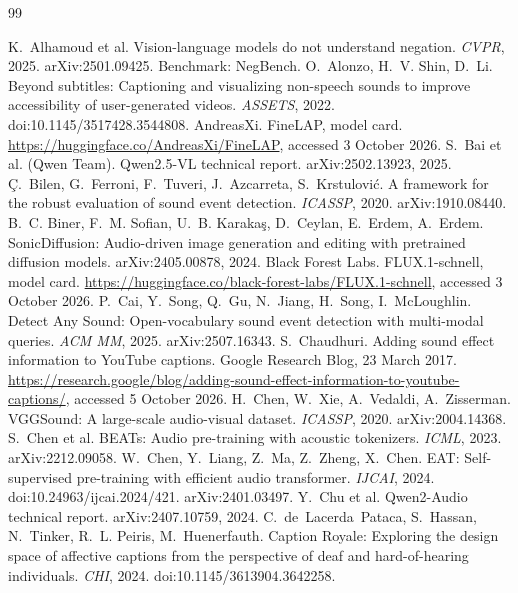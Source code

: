 \begin{thebibliography}{99}\small\setlength{\itemsep}{0.5pt}

 K.~Alhamoud et al. Vision-language models do not understand negation. \emph{CVPR}, 2025. arXiv:2501.09425. Benchmark: NegBench.
 O.~Alonzo, H.~V. Shin, D.~Li. Beyond subtitles: Captioning and visualizing non-speech sounds to improve accessibility of user-generated videos. \emph{ASSETS}, 2022. doi:10.1145/3517428.3544808.
 AndreasXi. FineLAP, model card. \url{https://huggingface.co/AndreasXi/FineLAP}, accessed 3 October 2026.
 S.~Bai et al. (Qwen Team). Qwen2.5-VL technical report. arXiv:2502.13923, 2025.
 \c{C}.~Bilen, G.~Ferroni, F.~Tuveri, J.~Azcarreta, S.~Krstulovi\'c. A framework for the robust evaluation of sound event detection. \emph{ICASSP}, 2020. arXiv:1910.08440.
 B.~C. Biner, F.~M. Sofian, U.~B. Karaka\c{s}, D.~Ceylan, E.~Erdem, A.~Erdem. SonicDiffusion: Audio-driven image generation and editing with pretrained diffusion models. arXiv:2405.00878, 2024.
 Black Forest Labs. FLUX.1-schnell, model card. \url{https://huggingface.co/black-forest-labs/FLUX.1-schnell}, accessed 3 October 2026.
 P.~Cai, Y.~Song, Q.~Gu, N.~Jiang, H.~Song, I.~McLoughlin. Detect Any Sound: Open-vocabulary sound event detection with multi-modal queries. \emph{ACM MM}, 2025. arXiv:2507.16343.
 S.~Chaudhuri. Adding sound effect information to YouTube captions. Google Research Blog, 23 March 2017. \url{https://research.google/blog/adding-sound-effect-information-to-youtube-captions/}, accessed 5 October 2026.
 H.~Chen, W.~Xie, A.~Vedaldi, A.~Zisserman. VGGSound: A large-scale audio-visual dataset. \emph{ICASSP}, 2020. arXiv:2004.14368.
 S.~Chen et al. BEATs: Audio pre-training with acoustic tokenizers. \emph{ICML}, 2023. arXiv:2212.09058.
 W.~Chen, Y.~Liang, Z.~Ma, Z.~Zheng, X.~Chen. EAT: Self-supervised pre-training with efficient audio transformer. \emph{IJCAI}, 2024. doi:10.24963/ijcai.2024/421. arXiv:2401.03497.
 Y.~Chu et al. Qwen2-Audio technical report. arXiv:2407.10759, 2024.
 C.~de~Lacerda~Pataca, S.~Hassan, N.~Tinker, R.~L. Peiris, M.~Huenerfauth. Caption Royale: Exploring the design space of affective captions from the perspective of deaf and hard-of-hearing individuals. \emph{CHI}, 2024. doi:10.1145/3613904.3642258.

\end{thebibliography}
